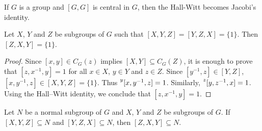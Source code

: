 If $G$ is a group and $[G,G]$ is central in $G$,
then the Hall-Witt becomes Jacobi's identity.

\begin{lemma}
	\label{lemma:3subgrupos}
	Let $X$, $Y$ and $Z$ be subgroups of $G$ 
 such that $[X,Y,Z]=[Y,Z,X]=\{1\}$.
	Then $[Z,X,Y]=\{1\}$.
\end{lemma}

\begin{proof}
Since $[x,y]\in C_G(z)$ implies $[X,Y]\subseteq C_G(Z)$, 
it is enough to prove that $[z,x^{-1},y]=1$ for all $x\in X$, $y\in Y$ and $z\in Z$. Since $[y^{-1},z]\in [Y,Z]$, $[x,y^{-1},z]\in [X,Y,Z]=\{1\}$. Thus $\prescript{y}{}[x,y^{-1},z]=1$. Similarly, $\prescript{z}{}[y,z^{-1},x]=1$. Using the Hall--Witt identity, we conclude that $[z,x^{-1},y]=1$.
\end{proof}

\begin{exercise}
\label{xca:3subgroups}
Let $N$ be a normal subgroup of $G$ and 
$X$, $Y$ and $Z$ be subgroups of $G$. If $[X,Y,Z]\subseteq N$ and $[Y,Z,X]\subseteq N$, then 
$[Z,X,Y]\subseteq N$.
\end{exercise}


